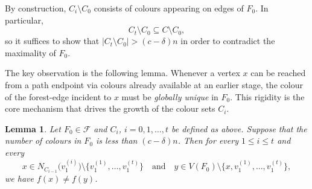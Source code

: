 \documentclass[11pt,reqno]{amsart}
\newtheorem{lemma}[theorem]{Lemma}
\theoremstyle{definition}
\theoremstyle{remark}
\renewcommand\le{\leqslant}
\begin{document}
By construction, $C_i\setminus C_0$ consists of colours appearing on edges of $F_0$.
In particular,
\[
C_t\setminus C_0 \subseteq C\setminus C_0,
\]
so it suffices to show that $|C_t\setminus C_0|>(c-\delta)n$ in order to contradict the
maximality of $F_0$.



The key observation is the following lemma. Whenever a vertex $x$ can be reached from a path endpoint via colours already
available at an earlier stage, the colour of the forest-edge incident to $x$ must
be \emph{globally unique} in $F_0$. This rigidity is the core mechanism that drives the growth of the colour sets
$C_i$.


\begin{lemma}\label{lem:keyobs}
Let $F_0\in\mathcal F$ and $C_i$, $i=0,1,\ldots,t$ be defined as above. 
Suppose that the number of colours in $F_0$ is less than $(c-\delta)n$.
Then for every $1\le i\le t$ and every
\[
x\in N_{C_{i-1}}\!\big(v_1^{(i)}\big)\setminus \{v_1^{(1)},\ldots,v_1^{(t)}\} \quad\text{and}\quad
y\in V(F_0)\setminus\{x,v_1^{(1)},\ldots,v_1^{(t)}\},
\]
we have $f(x)\neq f(y)$.
\end{lemma}
\end{document}
